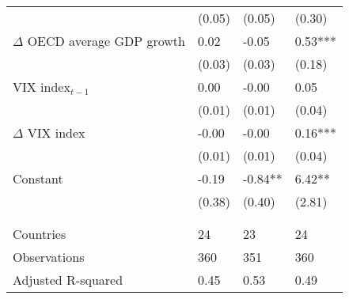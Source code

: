 {\begin{tabular}{lp{2cm}p{2cm}p{2cm}}
   & (0.05) & (0.05) & (0.30) \\ 
  $\Delta$ OECD average GDP growth & 0.02 & -0.05 & 0.53*** \\ 
   & (0.03) & (0.03) & (0.18) \\ 
  VIX index$_{t-1}$ & 0.00 & -0.00 & 0.05 \\ 
   & (0.01) & (0.01) & (0.04) \\ 
  $\Delta$ VIX index & -0.00 & -0.00 & 0.16*** \\ 
   & (0.01) & (0.01) & (0.04) \\ 
  Constant & -0.19 & -0.84** & 6.42** \\ 
   & (0.38) & (0.40) & (2.81) \\ 
   &  &  &  \\ 
   &  &  &  \\ 
  Countries & 24 & 23 & 24 \\ 
  Observations & 360 & 351 & 360 \\ 
  Adjusted R-squared & 0.45 & 0.53 & 0.49 \\ 
   \hline
\end{tabular}
}
